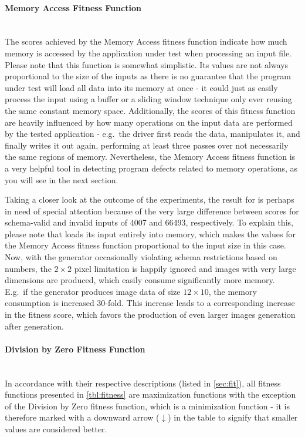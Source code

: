 \paragraph{Memory Access Fitness Function} ~\\
The scores achieved by the Memory Access fitness function indicate how much memory is accessed by the
application under test when processing an input file. Please note that this function is somewhat simplistic.
Its values are not always proportional to the size of the inputs as there is no guarantee that the program
under test will load all data into its memory at once - it could just as easily process the input using a
buffer or a sliding window technique only ever reusing the same constant memory space.
Additionally, the scores of this fitness function are heavily influenced by how many operations on the input
data are performed by the tested application - e.g.\ the \libpng driver first reads the data, manipulates
it, and finally writes it out again, performing at least three passes over not necessarily the same regions of
memory. Nevertheless, the Memory Access fitness function is a very helpful tool in detecting program defects
related to memory operations, as you will see in the next section. 

Taking a closer look at the outcome of the experiments, the result for \libpng is perhaps in need of special
attention because of the very large difference between scores for schema-valid and invalid inputs of 4007 and
66493, respectively. To explain this, please note that \libpng loads its input entirely into memory, which
makes the values for the Memory Access fitness function proportional to the input size in this case. Now, with
the generator occasionally violating schema restrictions based on numbers, the $2\times 2$ pixel limitation is
happily ignored and images with very large dimensions are produced, which easily consume significantly more
memory. E.g.\ if the generator produces image data of size $12 \times 10$, the memory consumption is increased
30-fold. This increase leads to a corresponding increase in the fitness score, which favors the production
of even larger images generation after generation.

\paragraph{Division by Zero Fitness Function} ~\\
In accordance with their respective descriptions (listed in \cref{sec:fit}), all fitness functions
presented in \cref{tbl:fitness} are maximization functions with the exception of the Division by Zero fitness
function, which is a minimization function - it is therefore marked with a downward arrow ($\downarrow$) in the
table to signify that smaller values are considered better.

